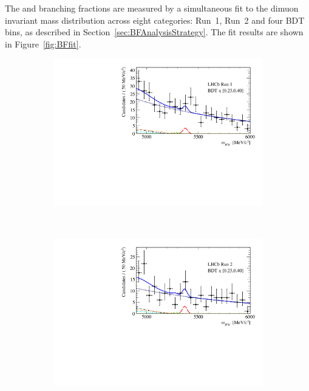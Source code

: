 {{%
The \bdmumu and \bsmumu branching fractions are measured by a simultaneous fit to the dimuon invariant mass distribution across eight categories: Run~1, Run~2 and four BDT bins, as described in Section~\ref{sec:BFAnalysisStrategy}. %
The fit results are shown in Figure~\ref{fig:BFfit}.

\begin{figure}[tbp]
    \centering
    \begin{subfigure}[b]{0.48\textwidth}
        \includegraphics[width=\textwidth]{./Figs/BFAnalysis/Fig17a.pdf}
    \end{subfigure}
    ~ %
    \begin{subfigure}[b]{0.48\textwidth}
       \includegraphics[width=\textwidth]{./Figs/BFAnalysis/Fig17e.pdf}

\end{subfigure}
\end{figure}}}
